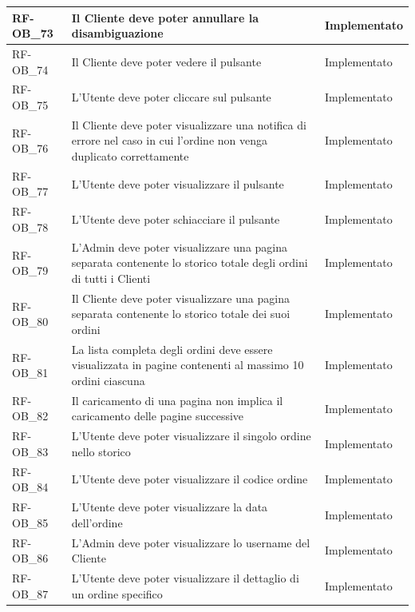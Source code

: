 \begin{longtable}{|>{\raggedright}p{}|>{\raggedright\arraybackslash}p{}|>{\raggedright\arraybackslash}p{}|}
	\hline
	RF-OB\_73 \hypertarget{rf-ob_73} & Il Cliente deve poter annullare la disambiguazione & Implementato \\
	\hline
	RF-OB\_74 \hypertarget{rf-ob_74} & Il Cliente deve poter vedere il pulsante \vr{Nuova chat} & Implementato \\
	\hline
	RF-OB\_75 \hypertarget{rf-ob_75} & L'Utente deve poter cliccare sul pulsante \vr{Nuova chat} & Implementato \\
	\hline
	RF-OB\_76 \hypertarget{rf-ob_76} & Il Cliente deve poter visualizzare una notifica di errore nel caso in cui l'ordine non venga duplicato correttamente & Implementato \\
	\hline
	RF-OB\_77 \hypertarget{rf-ob_77} & L'Utente deve poter visualizzare il pulsante \vr{visualizza storico ordini} & Implementato \\
	\hline
	RF-OB\_78 \hypertarget{rf-ob_78} & L'Utente deve poter schiacciare il pulsante \vr{visualizza storico ordini} & Implementato \\
	\hline
	RF-OB\_79 \hypertarget{rf-ob_79} & L'Admin deve poter visualizzare una pagina separata contenente lo storico totale degli ordini di tutti i Clienti & Implementato \\
	\hline
	RF-OB\_80 \hypertarget{rf-ob_80} & Il Cliente deve poter visualizzare una pagina separata contenente lo storico totale dei suoi ordini & Implementato \\
	\hline
	RF-OB\_81 \hypertarget{rf-ob_81} & La lista completa degli ordini deve essere visualizzata in pagine contenenti al massimo 10 ordini ciascuna & Implementato \\
	\hline
	RF-OB\_82 \hypertarget{rf-ob_82} & Il caricamento di una pagina non implica il caricamento delle pagine successive & Implementato \\
	\hline
	RF-OB\_83 \hypertarget{rf-ob_83} & L'Utente deve poter visualizzare il singolo ordine nello storico & Implementato \\
	\hline
	RF-OB\_84 \hypertarget{rf-ob_84} & L'Utente deve poter visualizzare il codice ordine & Implementato \\
	\hline
	RF-OB\_85 \hypertarget{rf-ob_85} & L'Utente deve poter visualizzare la data dell'ordine & Implementato \\
	\hline
	RF-OB\_86 \hypertarget{rf-ob_86} & L'Admin deve poter visualizzare lo username del Cliente & Implementato \\
	\hline
	RF-OB\_87 \hypertarget{rf-ob_87} & L'Utente deve poter visualizzare il dettaglio di un ordine specifico & Implementato \\

\end{longtable}
